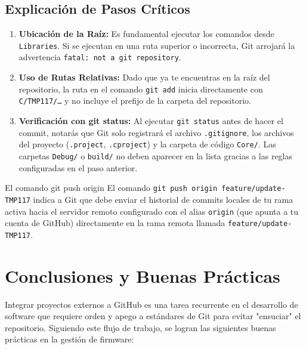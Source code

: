 \documentclass[
10pt, %
a4paper, %
oneside, %
headinclude,footinclude, %
BCOR5mm, %
]{scrartcl}
\begin{document}
\subsection{Explicación de Pasos Críticos}
\begin{enumerate}
	\item \textbf{Ubicación de la Raíz:} Es fundamental ejecutar los comandos desde \texttt{Libraries\string\Libraries}. Si se ejecutan en una ruta superior o incorrecta, Git arrojará la advertencia \texttt{fatal: not a git repository}.
	\item \textbf{Uso de Rutas Relativas:} Dado que ya te encuentras en la raíz del repositorio, la ruta en el comando \texttt{git add} inicia directamente con \texttt{C/TMP117/\dots} y no incluye el prefijo de la carpeta del repositorio.
	\item \textbf{Verificación con git status:} Al ejecutar \texttt{git status} antes de hacer el commit, notarás que Git solo registrará el archivo \texttt{.gitignore}, los archivos del proyecto (\texttt{.project}, \texttt{.cproject}) y la carpeta de código \texttt{Core/}. Las carpetas \texttt{Debug/} o \texttt{build/} no deben aparecer en la lista gracias a las reglas configuradas en el paso anterior.
\end{enumerate}

\begin{InfoBox}{El comando git push origin}
	El comando \texttt{git push origin feature/update-TMP117} indica a Git que debe enviar el historial de commits locales de tu rama activa hacia el servidor remoto configurado con el alias \texttt{origin} (que apunta a tu cuenta de GitHub) directamente en la rama remota llamada \texttt{feature/update-TMP117}.
\end{InfoBox}

\newpage
\section{Conclusiones y Buenas Prácticas}

Integrar proyectos externos a GitHub es una tarea recurrente en el desarrollo de software que requiere orden y apego a estándares de Git para evitar "ensuciar" el repositorio. Siguiendo este flujo de trabajo, se logran las siguientes buenas prácticas en la gestión de firmware:
\end{document}
